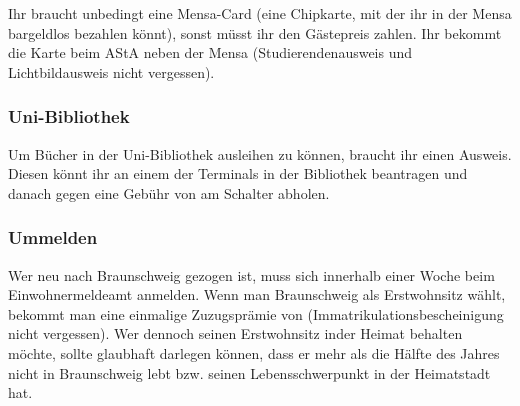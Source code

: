 Ihr braucht unbedingt eine Mensa-Card (eine Chipkarte,
mit der ihr in der Mensa bargeldlos bezahlen k\"onnt), sonst
m\"usst ihr den G\"astepreis zahlen. Ihr bekommt die Karte beim
AStA neben der Mensa (Studierendenausweis und Lichtbildausweis
nicht vergessen).

\subsubsection{Uni-Bibliothek}

Um B\"ucher in der Uni-Bibliothek ausleihen zu k\"onnen, braucht ihr
einen Ausweis. Diesen k\"onnt ihr an einem der Terminals in der
Bibliothek beantragen und danach gegen eine Geb\"uhr von \unit[5]{\EUR}{}
am Schalter abholen.

\subsubsection{Ummelden}

Wer neu nach Braunschweig gezogen ist, muss sich innerhalb einer
Woche beim Einwohnermeldeamt anmelden. Wenn man Braunschweig als
Erstwohnsitz w\"ahlt, bekommt man eine einmalige Zuzugspr\"amie von
\unit[200]{\EUR}{} (Immatrikulationsbescheinigung nicht vergessen). Wer
dennoch seinen Erstwohnsitz inder Heimat behalten m\"ochte, sollte
glaubhaft darlegen k\"onnen, dass er mehr als die H\"alfte des Jahres
nicht in Braunschweig lebt bzw. seinen Lebensschwerpunkt in der
Heimatstadt hat.

